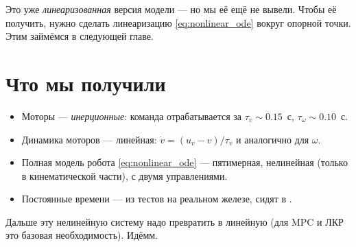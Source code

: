 Это уже \emph{линеаризованная} версия модели --- но мы её ещё не вывели.
Чтобы её получить, нужно сделать линеаризацию \eqref{eq:nonlinear_ode} вокруг
опорной точки. Этим займёмся в следующей главе.

\section{Что мы получили}

\begin{itemize}
  \item Моторы --- \emph{инерционные}: команда отрабатывается за $\tau_v
        \sim 0.15$~с, $\tau_\omega \sim 0.10$~с.
  \item Динамика моторов --- линейная: $\dot{v} = (u_v - v)/\tau_v$ и
        аналогично для $\omega$.
  \item Полная модель робота \eqref{eq:nonlinear_ode} --- пятимерная,
        нелинейная (только в кинематической части), с двумя управлениями.
  \item Постоянные времени --- из тестов на реальном железе, сидят
        в .
\end{itemize}

Дальше эту нелинейную систему надо превратить в линейную (для MPC и
ЛКР это базовая необходимость). Идёмм.
